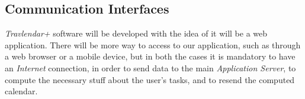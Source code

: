 \subsection{Communication Interfaces}
\emph{Travlendar+} software will be developed with the idea of it will be a web application. There will be more way to access to our application, such as through a web browser or a mobile device, but in both the cases it is mandatory to have an \emph{Internet} connection, in order to send data to the main \emph{Application Server}, to compute the necessary stuff about the user's tasks, and to resend the computed calendar.